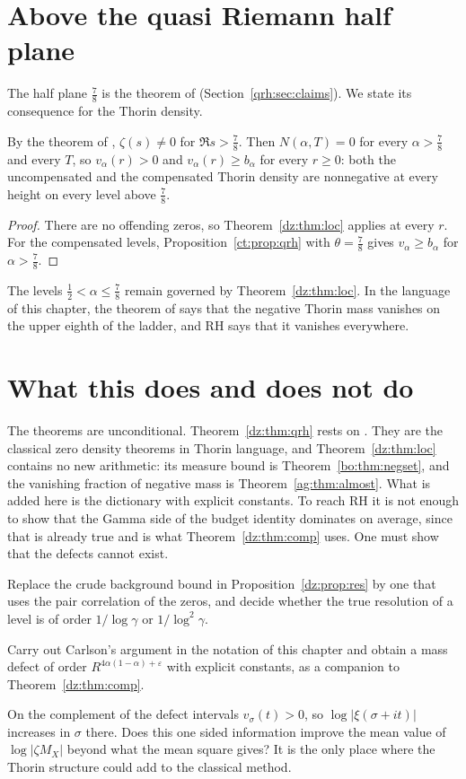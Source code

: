\section{Above the quasi Riemann half plane}\label{dz:sec:qrh}
The half plane $\frac78$ is the theorem of \cite{OAI26a} (Section~\ref{qrh:sec:claims}). We state its consequence for the Thorin density.
\begin{theorem}\label{dz:thm:qrh}
By the theorem of \cite{OAI26a}, $\zeta(s)\ne0$ for $\Re s>\frac78$. Then $N(\alpha,T)=0$ for every $\alpha>\frac78$ and every $T$, so $v_\alpha(r)>0$ and $v_\alpha(r)\ge b_\alpha$ for every $r\ge0$: both the uncompensated and the compensated Thorin density are nonnegative at every height on every level above $\frac78$.
\end{theorem}
\begin{proof}
There are no offending zeros, so Theorem~\ref{dz:thm:loc} applies at every $r$. For the compensated levels, Proposition~\ref{ct:prop:qrh} with $\theta=\frac78$ gives $v_\alpha\ge b_\alpha$ for $\alpha>\frac78$.
\end{proof}
The levels $\frac12<\alpha\le\frac78$ remain governed by Theorem~\ref{dz:thm:loc}. In the language of this chapter, the theorem of \cite{OAI26a} says that the negative Thorin mass vanishes on the upper eighth of the ladder, and RH says that it vanishes everywhere.

\section{What this does and does not do}\label{dz:sec:limits}
The theorems are unconditional. Theorem~\ref{dz:thm:qrh} rests on \cite{OAI26a}. They are the classical zero density theorems in Thorin language, and Theorem~\ref{dz:thm:loc} contains no new arithmetic: its measure bound is Theorem~\ref{bo:thm:negset}, and the vanishing fraction of negative mass is Theorem~\ref{ag:thm:almost}. What is added here is the dictionary with explicit constants.
To reach RH it is not enough to show that the Gamma side of the budget identity dominates on average, since that is already true and is what Theorem~\ref{dz:thm:comp} uses. One must show that the defects cannot exist.
\begin{problem}\label{dz:op:corr}
Replace the crude background bound in Proposition~\ref{dz:prop:res} by one that uses the pair correlation of the zeros, and decide whether the true resolution of a level is of order $1/\log\gamma$ or $1/\log^2\gamma$.
\end{problem}
\begin{problem}\label{dz:op:carlson}
Carry out Carlson's argument in the notation of this chapter and obtain a mass defect of order $R^{4\alpha(1-\alpha)+\varepsilon}$ with explicit constants, as a companion to Theorem~\ref{dz:thm:comp}.
\end{problem}
\begin{problem}\label{dz:op:pos}
On the complement of the defect intervals $v_\sigma(t)>0$, so $\log|\xi(\sigma+it)|$ increases in $\sigma$ there. Does this one sided information improve the mean value of $\log|\zeta M_X|$ beyond what the mean square gives? It is the only place where the Thorin structure could add to the classical method.
\end{problem}
